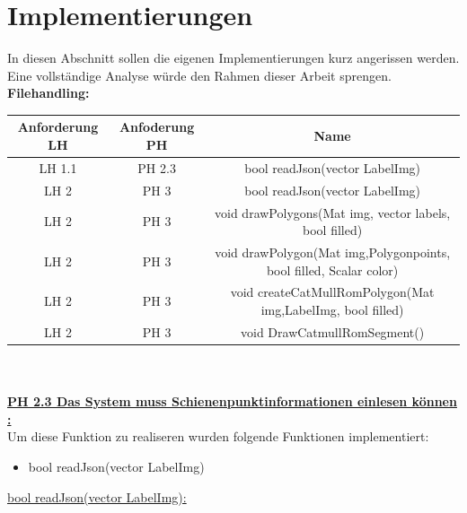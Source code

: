 \documentclass[11pt]{scrartcl}
\begin{document}
\section{Implementierungen}
\label{sec:Implementierungen}
In diesen Abschnitt sollen die eigenen Implementierungen kurz angerissen werden. Eine vollständige Analyse würde den Rahmen dieser Arbeit sprengen.
\\

\noindent
\textbf{Filehandling:}
\\

\noindent
\begin{tabular}[h]{c|c|c}
Anforderung LH & Anfoderung PH & Name \\
\hline
 LH 1.1 & PH 2.3 & bool  readJson(vector LabelImg)\\
LH 2 & PH 3 & bool readJson(vector LabelImg)\\
LH 2 & PH 3 &void drawPolygons(Mat img, vector labels, bool filled)\\
LH 2 & PH 3 & void drawPolygon(Mat img,Polygonpoints, bool filled, Scalar color)\\
LH 2 & PH 3 &void createCatMullRomPolygon(Mat img,LabelImg, bool filled)\\
LH 2 & PH 3 &void DrawCatmullRomSegment()\\
\end{tabular}
\\

\noindent
\\

\noindent
\underline{\textbf{PH 2.3 Das System muss Schienenpunktinformationen einlesen können :}}
\\

\noindent
Um diese Funktion zu realiseren wurden folgende Funktionen implementiert:
\begin{itemize}
	\item bool readJson(vector LabelImg)
\end{itemize}

\noindent
\underline{bool readJson(vector LabelImg):}
\\
\end{document}
